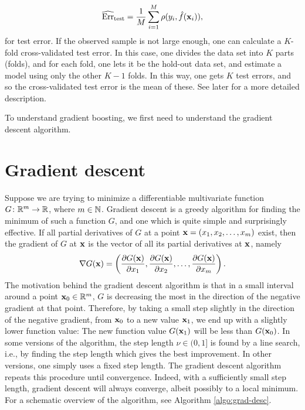 \begin{equation*}
    \widehat{\text{Err}}_{\text{test}}=\frac{1}{M}\sum_{i=1}^M \rho(y_i,\hat{f}(\mathbf{x}_i)),
\end{equation*}
for test error. If the observed sample is not large enough, one can calculate a $K$-fold cross-validated test error. In this case, one divides the data set into $K$ parts (folds), and for each fold, one lets it be the hold-out data set, and estimate a model using only the other $K-1$ folds. In this way, one gets $K$ test errors, and so the cross-validated test error is the mean of these. See later for a more detailed description.

To understand gradient boosting, we first need to understand the gradient descent algorithm.
\section{Gradient descent}
Suppose we are trying to minimize a differentiable multivariate function $G\colon\mathbb{R}^m\to\mathbb{R}$, where $m\in\mathbb{N}$. Gradient descent is a greedy algorithm for finding the minimum of such a function $G$, and one which is quite simple and surprisingly effective. If all partial derivatives of $G$ at a point $\mathbf{x}=(x_1,x_2,\ldots,x_m)$ exist, then the gradient of $G$ at $\mathbf{x}$ is the vector of all its partial derivatives at $\mathbf{x}$, namely
\begin{equation}
    \nabla G(\mathbf{x})=\left(\frac{\partial G(\mathbf{x})}{\partial x_1},\frac{\partial G(\mathbf{x})}{\partial x_2},\ldots,\frac{\partial G(\mathbf{x})}{\partial x_m}\right).
\end{equation}
The motivation behind the gradient descent algorithm is that in a small interval around a point $\mathbf{x}_0\in\mathbb{R}^m$, $G$ is decreasing the most in the direction of the negative gradient at that point. Therefore, by taking a small step slightly in the direction of the negative gradient, from $\mathbf{x}_0$ to a new value $\mathbf{x}_1$, we end up with a slightly lower function value: The new function value $G(\mathbf{x}_1)$ will be less than $G(\mathbf{x}_0)$. In some versions of the algorithm, the step length $\nu\in(0,1]$ is found by a line search, i.e., by finding the step length which gives the best improvement. In other versions, one simply uses a fixed step length. The gradient descent algorithm repeats this procedure until convergence. Indeed, with a sufficiently small step length, gradient descent will always converge, albeit possibly to a local minimum. For a schematic overview of the algorithm, see Algorithm \ref{algo:grad-desc}.
